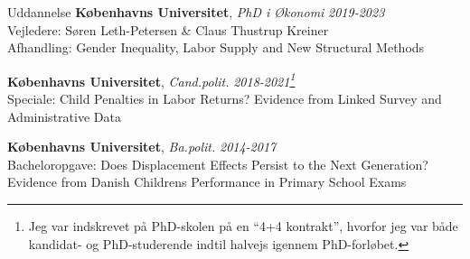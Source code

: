 \documentclass[
	10pt, %
]{resume} %
\begin{document}

\begin{rSection}{Uddannelse}
    \textbf{Københavns Universitet}, \textit{PhD i Økonomi} \hfill \textit{2019-2023} \\
    Vejledere: Søren Leth-Petersen \& Claus Thustrup Kreiner \\
    Afhandling: {Gender Inequality, Labor Supply and New Structural Methods}

    \textbf{Københavns Universitet}, \textit{Cand.polit.} \hfill \textit{2018-2021\footnote{Jeg var indskrevet på PhD-skolen på en ``4+4 kontrakt'', hvorfor jeg var både kandidat- og PhD-studerende indtil halvejs igennem PhD-forløbet.}} \\
    Speciale: {Child Penalties in Labor Returns? Evidence from Linked Survey and Administrative Data}

    \textbf{Københavns Universitet}, \textit{Ba.polit.} \hfill \textit{2014-2017} \\
    Bacheloropgave: {Does Displacement Effects Persist to the Next Generation? Evidence from Danish Childrens Performance in Primary School Exams}
\end{rSection}

\end{document}
